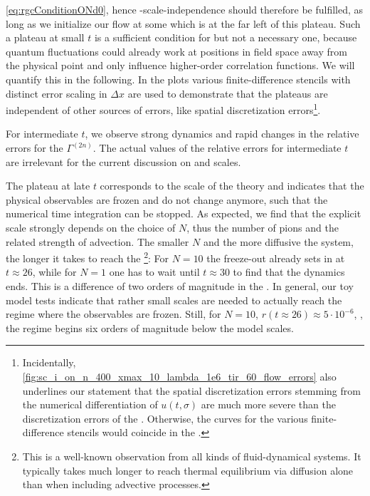 \rgcy{} \eqref{eq:rgcConditionONd0}, hence \uv{}-scale-independence should therefore be fulfilled, as long as we initialize our \frg{} flow at some \rgscale{} which is at the far left of this plateau.
Such a plateau at small $t$ is a sufficient condition for \rgcy{} but not a necessary one, because quantum fluctuations could already work at positions in field space away from the \ir{} physical point and only influence higher-order correlation functions.
We will quantify this in the following.
In the plots various finite-difference stencils with distinct error scaling in $\Delta x$ are used to demonstrate that the plateaus are independent of other sources of errors, like spatial discretization errors\footnote{%
	Incidentally, \cref{fig:sc_i_on_n_400_xmax_10_lambda_1e6_tir_60_flow_errors} also underlines our statement that the spatial discretization errors stemming from the numerical differentiation of $u ( t, \sigma )$ are much more severe than the discretization errors of the \ktScheme{}.
	Otherwise, the curves for the various finite-difference stencils would coincide in the \ir{}.%
}.

For intermediate $t$, we observe strong dynamics and rapid changes in the relative errors for the $\Gamma^{(2n)}$.
The actual values of the relative errors for intermediate $t$ are irrelevant for the current discussion on \uv{} and \ir{} scales.

The plateau at late \rgtimes{} $t$ corresponds to the \ir{} scale of the theory and indicates that the physical observables are frozen and do not change anymore, such that the numerical time integration can be stopped.
As expected, we find that the explicit \ir{} scale strongly depends on the choice of $N$, thus the number of pions and the related strength of advection.
The smaller $N$ and the more diffusive the system, the longer it takes to reach the \ir{}\footnote{%
	This is a well-known observation from all kinds of fluid-dynamical systems.
	It typically takes much longer to reach thermal equilibrium via diffusion alone than when including advective processes.
}: For $N = 10$ the freeze-out already sets in at $t \approx 26$, while for $N = 1$ one has to wait until $t \approx 30$ to find that the dynamics ends.
This is a difference of two orders of magnitude in the \rgscale{}.
In general, our toy model tests indicate that rather small \ir{} scales are needed to actually reach the regime where the observables are frozen. 
Still, for $N = 10$, $r(t \approx 26) \approx 5 \cdot 10^{-6}$, \ie{}, the \ir{} regime begins six orders of magnitude below the model scales.

